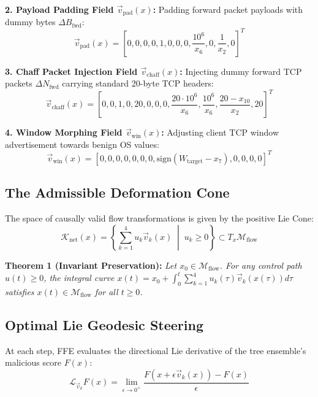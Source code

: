 \documentclass[10pt,journal,compsoc]{IEEEtran}
\begin{document}
\textbf{2. Payload Padding Field $\vec{v}_{\text{pad}}(x)$:}
Padding forward packet payloads with dummy bytes $\Delta B_{\text{fwd}}$:
\begin{equation}
    \vec{v}_{\text{pad}}(x) = \left[ 0, 0, 0, 0, 1, 0, 0, 0, \frac{10^6}{x_6}, 0, \frac{1}{x_2}, 0 \right]^T
\end{equation}

\textbf{3. Chaff Packet Injection Field $\vec{v}_{\text{chaff}}(x)$:}
Injecting dummy forward TCP packets $\Delta N_{\text{fwd}}$ carrying standard 20-byte TCP headers:
\begin{equation}
    \vec{v}_{\text{chaff}}(x) = \left[ 0, 0, 1, 0, 20, 0, 0, 0, \frac{20 \cdot 10^6}{x_6}, \frac{10^6}{x_6}, \frac{20 - x_{10}}{x_2}, 20 \right]^T
\end{equation}

\textbf{4. Window Morphing Field $\vec{v}_{\text{win}}(x)$:}
Adjusting client TCP window advertisement towards benign OS values:
\begin{equation}
    \vec{v}_{\text{win}}(x) = \left[ 0, 0, 0, 0, 0, 0, 0, \text{sign}(W_{\text{target}} - x_7), 0, 0, 0, 0 \right]^T
\end{equation}

\subsection{The Admissible Deformation Cone}
The space of causally valid flow transformations is given by the positive Lie Cone:
\begin{equation}
    \mathcal{K}_{\text{net}}(x) = \left\{ \sum_{k=1}^4 u_k \vec{v}_k(x) \;\middle|\; u_k \ge 0 \right\} \subset T_x \mathcal{M}_{\text{flow}}
\end{equation}

\textbf{Theorem 1 (Invariant Preservation):} \emph{Let $x_0 \in \mathcal{M}_{\text{flow}}$. For any control path $u(t) \ge 0$, the integral curve $x(t) = x_0 + \int_0^t \sum_{k=1}^4 u_k(\tau) \vec{v}_k(x(\tau)) d\tau$ satisfies $x(t) \in \mathcal{M}_{\text{flow}}$ for all $t \ge 0$.}

\subsection{Optimal Lie Geodesic Steering}
At each step, FFE evaluates the directional Lie derivative of the tree ensemble's malicious score $F(x)$:
\begin{equation}
    \mathcal{L}_{\vec{v}_k} F(x) = \lim_{\epsilon \to 0^+} \frac{F(x + \epsilon \vec{v}_k(x)) - F(x)}{\epsilon}
\end{equation}
\end{document}
